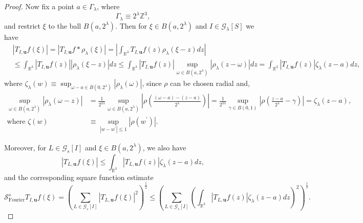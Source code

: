 \documentclass{amsart}%
\theoremstyle{plain}
\numberwithin{equation}{section}
\begin{document}
\begin{proof}
Now fix a point $a\in\Gamma_{\lambda}$, where%
\[
\Gamma_{\lambda}\equiv2^{\lambda}\mathbb{Z}^{3},
\]
and restrict $\xi$ to the ball $B\left(  a,2^{\lambda}\right)  $. Then for
$\xi\in B\left(  a,2^{\lambda}\right)  $ and $I\in\mathcal{G}_{\lambda}\left[
S\right]  $ we have
\begin{align}
&  \left\vert T_{I,\mathbf{u}}f\left(  \xi\right)  \right\vert =\left\vert
T_{I,\mathbf{u}}f\ast\rho_{\lambda}\left(  \xi\right)  \right\vert =\left\vert
\int_{\mathbb{R}^{3}}T_{I,\mathbf{u}}f\left(  z\right)  \rho_{\lambda}\left(
\xi-z\right)  dz\right\vert \label{exclaim}\\
&  \leq\int_{\mathbb{R}^{3}}\left\vert T_{I,\mathbf{u}}f\left(  z\right)
\right\vert \left\vert \rho_{\lambda}\left(  \xi-z\right)  \right\vert
dz\leq\int_{\mathbb{R}^{3}}\left\vert T_{I,\mathbf{u}}f\left(  z\right)
\right\vert \sup_{\omega\in B\left(  a,2^{\lambda}\right)  }\left\vert
\rho_{\lambda}\left(  z-\omega\right)  \right\vert dz=\int_{\mathbb{R}^{3}%
}\left\vert T_{I,\mathbf{u}}f\left(  z\right)  \right\vert \zeta_{\lambda
}\left(  z-a\right)  dz,\nonumber
\end{align}
where $\zeta_{\lambda}\left(  w\right)  \equiv\sup_{\omega-a\in B\left(
0,2^{\lambda}\right)  }\left\vert \rho_{\lambda}\left(  \omega\right)
\right\vert $, since $\rho$ can be chosen radial and,
\begin{align*}
\sup_{\omega\in B\left(  a,2^{\lambda}\right)  }\left\vert \rho_{\lambda
}\left(  \omega-z\right)  \right\vert  &  =\frac{1}{2^{3\lambda}}\sup
_{\omega\in B\left(  a,2^{\lambda}\right)  }\left\vert \rho\left(
\frac{\left(  \omega-a\right)  -\left(  z-a\right)  }{2^{\lambda}}\right)
\right\vert =\frac{1}{2^{3\lambda}}\sup_{\gamma\in B\left(  0,1\right)
}\left\vert \rho\left(  \frac{z-a}{2^{\lambda}}-\gamma\right)  \right\vert
=\zeta_{\lambda}\left(  z-a\right)  ,\\
\text{where }\zeta\left(  w\right)   &  \equiv\sup_{\left\vert w-w^{\prime
}\right\vert \leq1}\left\vert \rho\left(  w^{\prime}\right)  \right\vert .
\end{align*}


Moreover, for $L\in\mathcal{G}_{s}\left[  I\right]  $ and $\xi\in B\left(
a,2^{\lambda}\right)  $, we also have%
\[
\left\vert T_{L,\mathbf{u}}f\left(  \xi\right)  \right\vert \leq
\int_{\mathbb{R}^{3}}\left\vert T_{L,\mathbf{u}}f\left(  z\right)  \right\vert
\zeta_{\lambda}\left(  z-a\right)  dz,
\]
and the corresponding square function estimate%
\begin{equation}
\mathcal{S}_{\operatorname*{Fourier}}^{s}T_{I,\mathbf{u}}f\left(  \xi\right)
=\left(  \sum_{L\in\mathcal{G}_{s}\left[  I\right]  }\left\vert
T_{L,\mathbf{u}}f\left(  \xi\right)  \right\vert ^{2}\right)  ^{\frac{1}{2}%
}\leq\left(  \sum_{L\in\mathcal{G}_{s}\left[  I\right]  }\left(
\int_{\mathbb{R}^{3}}\left\vert T_{L,\mathbf{u}}f\left(  z\right)  \right\vert
\zeta_{\lambda}\left(  z-a\right)  dz\right)  ^{2}\right)  ^{\frac{1}{2}}.
\label{exclaim square}%
\end{equation}



\end{proof}
\end{document}
